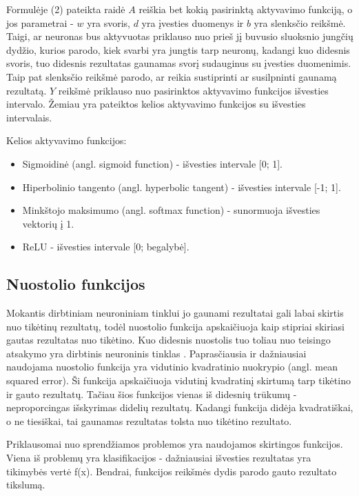 \documentclass{VUMIFPSbakalaurinis}
\begin{document}
Formulėje (2) pateikta raidė \(A\) reiškia bet kokią pasirinktą aktyvavimo funkciją, o jos parametrai - \(w\) yra svoris, \(d\) yra įvesties duomenys ir \(b\) yra slenksčio reikšmė. Taigi, ar neuronas bus aktyvuotas priklauso nuo prieš jį 
buvusio sluoksnio jungčių dydžio, kurios parodo, kiek svarbi yra jungtis tarp neuronų, kadangi kuo didesnis svoris, tuo didesnis rezultatas gaunamas svorį sudauginus su įvesties duomenimis. Taip pat slenksčio reikšmė parodo, ar reikia 
sustiprinti ar susilpninti gaunamą rezultatą. \(Y\) reikšmė priklauso nuo pasirinktos aktyvavimo funkcijos išvesties intervalo. Žemiau yra pateiktos kelios aktyvavimo funkcijos su išvesties intervalais.  

Kelios aktyvavimo funkcijos:
\begin{itemize}
\item Sigmoidinė (angl. sigmoid function) - išvesties intervale [0; 1].
\item Hiperbolinio tangento (angl. hyperbolic tangent) - išvesties intervale [-1; 1].
\item Minkštojo maksimumo (angl. softmax function) - sunormuoja išvesties vektorių į 1.
\item ReLU - išvesties intervale [0; begalybė].
\end{itemize}

\subsection{Nuostolio funkcijos}
Mokantis dirbtiniam neuroniniam tinklui jo gaunami rezultatai gali labai skirtis nuo tikėtinų rezultatų, todėl nuostolio funkcija apskaičiuoja kaip stipriai
skiriasi gautas rezultatas nuo tikėtino. Kuo didesnis nuostolis tuo toliau nuo teisingo atsakymo yra dirbtinis neuroninis tinklas \cite{Cameron-loss-fun}.
Paprasčiausia ir dažniausiai naudojama nuostolio funkcija yra vidutinio kvadratinio nuokrypio (angl. mean squared error). Ši funkcija apskaičiuoja vidutinį kvadratinį skirtumą tarp tikėtino 
ir gauto rezultatų. Tačiau šios funkcijos vienas iš didesnių trūkumų - neproporcingas išskyrimas didelių rezultatų. Kadangi funkcija didėja kvadratiškai,
o ne tiesiškai, tai gaunamas rezultatas tolsta nuo tikėtino rezultato.

Priklausomai nuo sprendžiamos problemos yra naudojamos skirtingos funkcijos. Viena iš problemų yra klasifikacijos - dažniausiai išvesties
rezultatas yra tikimybės vertė f(x). Bendrai, funkcijos reikšmės dydis parodo gauto rezultato tikslumą.
\end{document}
